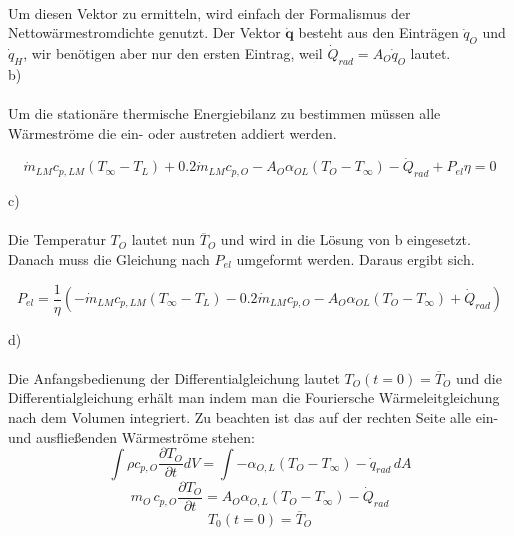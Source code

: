 \\ \newline
\bigskip
\noindent
Um diesen Vektor zu ermitteln, wird einfach der Formalismus der Nettowärmestromdichte genutzt.
Der Vektor \(\dot{\textbf{q}}\) besteht aus den Einträgen \(\dot{q}_O\) und \(\dot{q}_H\), wir benötigen aber nur den ersten Eintrag, weil \(\dot{Q}_{rad} = A_O \dot{q}_O\) lautet.
\bigskip \\
b) \\
\\
Um die stationäre thermische Energiebilanz zu bestimmen müssen alle Wärmeströme die ein- oder austreten addiert werden. 

\[\dot{m}_{LM} c_{p,LM} (T_\infty-T_L)+0.2\dot{m}_{LM} c_{p,O}-A_O \alpha_{OL}(T_O-T_\infty)-\dot{Q}_{rad}+P_{el}\eta=0\]
\bigskip 

\noindent c)  \\ 
\\ 
Die Temperatur \(T_O\) lautet nun \(\overline{T}_O\) und wird in die Lösung von b eingesetzt. Danach muss die Gleichung nach \(P_{el}\) umgeformt werden. Daraus ergibt sich. 

\[P_{el}=\frac{1}{\eta}\left(-\dot{m}_{LM} c_{p,LM} (T_\infty-T_L)-0.2\dot{m}_{LM} c_{p,O}-A_O \alpha_{OL}(T_O-T_\infty)+\dot{Q}_{rad}\right)\]

\bigskip 

\noindent d)  \\ 
\\
Die Anfangsbedienung der Differentialgleichung lautet \(T_O(t=0)=\overline{T}_O\) und die Differentialgleichung erhält man indem man die Fouriersche Wärmeleitgleichung nach dem Volumen integriert. Zu beachten ist das auf der rechten Seite alle ein- und ausfließenden Wärmeströme stehen: 
\[
\int \rho c_{p,O} \frac{\partial T_O}{\partial t} dV = \int -\alpha_{O,L}(T_O-T_\infty) - \dot{q}_{rad}\, dA
\]
\[
m_O\,c_{p,O} \frac{\partial T_O}{\partial t} = A_O \alpha_{O,L} (T_O-T_\infty) - \dot{Q}_{rad}
\]
\[
T_0(t=0)= \overline{T}_O
\]